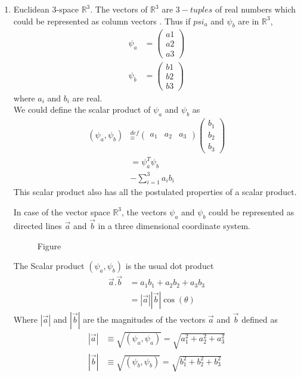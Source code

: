 \begin{enumerate}[label=\textbf{Example \arabic*},start=1]
	
	\item 
	Euclidean 3-space $\mathbb{R}^3$. The vectors of $\mathbb{R}^3$ are $3-tuples$ of real numbers which could be represented as column vectors . Thus if $psi_a$ and $\psi_b$ are in $\mathbb{R}^3$,
	\begin{eqnarray}\label{eqn:2.42-2.43}
		\psi_a &= \left(
		\begin{matrix}
			a1 \\ a2 \\ a3
		\end{matrix}
		\right)\\
		\psi_b &= \left(
		\begin{matrix}
			b1 \\b2 \\b3
		\end{matrix}
		\right)
	\end{eqnarray}
	where $a_i$ and $b_i$ are real. \\
	We could define the scalar product of $\psi_a$ and $\psi_b$ as
	\begin{eqnarray}\label{eqn:2.44-2.46}
		(\psi_a, \psi_b) &_\equiv^{def} 
		\left(
		\begin{matrix}
			a_1 & a_2 & a_3
		\end{matrix}
		\right)\left(
		\begin{matrix}
			b_1 \\ b_2 \\ b_3
		\end{matrix}
		\right) \\
		&= \psi_a^T \psi_b \\
		&- \sum_{i=1}^{3} a_i b_i
	\end{eqnarray}
	This scalar product also has all the postulated properties of a scalar product.
	
	
	In case of the vector space $\mathbb{R}^3$, the vectors $\psi_a$ and $\psi_b$ could be represented as directed lines $\vec{a}$ and $\vec{b}$ in a three dimensional coordinate system.
	
	
	\begin{figure}
		\caption{Figure}
	\end{figure}
	
	The Scalar product $(\psi_a, \psi_b)$ is the usual dot product
	\begin{eqnarray}\label{eqn:2.47-2.48}
		\vec{a} . \vec{b} &= a_1 b_1 + a_2 b_2 + a_3 b_3 \\
		&= |\vec{a}||\vec{b}| \cos(\theta)
	\end{eqnarray}
	Where $|\vec{a}|$ and $|\vec{b}|$ are the magnitudes of the vectors $\vec{a}$ and $\vec{b}$ defined as
	\begin{eqnarray}\label{eqn:2.49-2.50}
		|\vec{a}| &\equiv \sqrt{(\psi_a , \psi_a)} = \sqrt{a_1^2 + a_2^2 + a_3^2} \\
		|\vec{b}| &\equiv \sqrt{(\psi_b, \psi_b)} = \sqrt{b_1^2 + b_2^2 + b_3^2}
	\end{eqnarray}
	
\end{enumerate}

